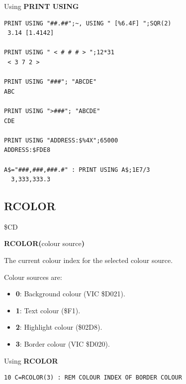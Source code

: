 \begin{description}[leftmargin=2cm,style=nextline]
\newpage
\item [Examples:] Using {\bf PRINT USING}

\begin{tcolorbox}[colback=black,coltext=white]
\verbatimfont{\codefont}
\begin{verbatim}
PRINT USING "##.##";~, USING " [%6.4F] ";SQR(2)
 3.14 [1.4142]

PRINT USING " < # # # > ";12*31
 < 3 7 2 >

PRINT USING "###"; "ABCDE"
ABC

PRINT USING ">###"; "ABCDE"
CDE

PRINT USING "ADDRESS:$%4X";65000
ADDRESS:$FDE8

A$="###,###,###.#" : PRINT USING A$;1E7/3
  3,333,333.3
\end{verbatim}
\end{tcolorbox}
\end{description}


\newpage
\subsection{RCOLOR}
\begin{description}[leftmargin=2cm,style=nextline]
\item [Token:]    \$CD

\item [Format:]   {\bf RCOLOR(}colour source{\bf)}

\item [Returns:]  The current colour index for the selected colour source.

                  Colour sources are:
                  \begin{itemize}
                     \item {\bf 0}: Background colour (VIC \$D021).
                     \item {\bf 1}: Text colour (\$F1).
                     \item {\bf 2}: Highlight colour (\$02D8).
                     \item {\bf 3}: Border colour (VIC \$D020).
                  \end{itemize}

\item [Example:]  Using {\bf RCOLOR}

\begin{tcolorbox}[colback=black,coltext=white]
\verbatimfont{\codefont}
\begin{verbatim}
10 C=RCOLOR(3) : REM COLOUR INDEX OF BORDER COLOUR
\end{verbatim}
\end{tcolorbox}
\end{description}

